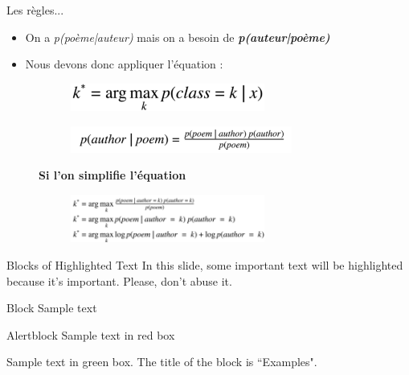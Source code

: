 \documentclass[aspectratio=169,xcolor=dvipsnames, t]{beamer}
\begin{document}
\begin{frame}{Les règles...}
	\begin{itemize}
		\item On a \textit{p(poème|auteur)} mais on a besoin de \textbf{\textit{p(auteur|poème)}}
		\item Nous devons donc appliquer l'équation :
	\end{itemize}
	
	\begin{figure}
		\centering
		\begin{subfigure}{.5\textwidth}
			\centering
			\includegraphics[width=0.7\textwidth]{figures/eq2.png}
		\end{subfigure}%
		\begin{subfigure}{.5\textwidth}
			\centering
			\includegraphics[width=0.8\textwidth]{figures/eq3.png}
		\end{subfigure}
		\textbf{Si l'on simplifie l'équation}
		\begin{figure}
			\includegraphics[width=0.7\textwidth]{figures/img2.png}
		\end{figure}
	\end{figure}

\end{frame}




\begin{frame}{Blocks of Highlighted Text}
    In this slide, some important text will be \alert{highlighted} because it's important. Please, don't abuse it.

    \begin{block}{Block}
        Sample text
    \end{block}

    \begin{alertblock}{Alertblock}
        Sample text in red box
    \end{alertblock}

    \begin{examples}
        Sample text in green box. The title of the block is ``Examples".
    \end{examples}
\end{frame}
\end{document}
